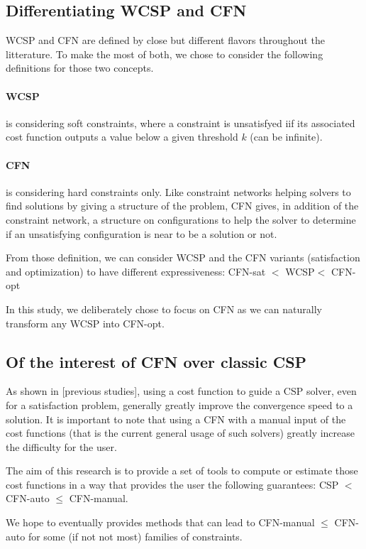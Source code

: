 \documentclass[letterpaper]{article} %
\newcommand{\cfn}{\textsc{CFN}\xspace}
\newcommand{\wcsp}{\textsc{WCSP}\xspace}
\begin{document}
\subsection{Differentiating \wcsp and \cfn}
\wcsp and \cfn are defined by close but different flavors throughout the litterature. To make the most of both, we chose to consider the following definitions for those two concepts.

\paragraph{\wcsp} is  considering soft  constraints, where  a constraint  is
  unsatisfyed iif its associated cost function outputs a value below a
  given threshold $k$ (can be infinite).

\paragraph{\cfn} is  considering  hard constraints  only.  Like  constraint
  networks helping solvers to find  solutions by giving a structure of
  the problem,  CFN gives,  in addition of  the constraint  network, a
  structure on  configurations to help  the solver to determine  if an
  unsatisfying configuration is near to be a solution or not.

From those definition, we can consider \wcsp and the \cfn variants (satisfaction and optimization) to have different expressiveness: \cfn-sat $<$ \wcsp $<$ \cfn-opt

In this study, we deliberately chose to focus on \cfn as we can naturally transform any \wcsp into \cfn-opt.

\subsection{Of the interest of \cfn over classic CSP}
As shown in [previous studies], using a cost function to guide a CSP solver, even for a satisfaction problem, generally greatly improve the convergence speed to a solution.
It is important to note that using a \cfn with a manual input of the cost functions (that is the current general usage of such solvers) greatly increase the difficulty for the user.

The aim of this research is to provide a set of tools to compute or estimate those cost functions in a way that provides the user the following guarantees:
CSP $<$ CFN-auto $\leq$ CFN-manual.

We hope to eventually provides methods that can lead to CFN-manual $\leq$ CFN-auto for some (if not not most) families of constraints.
\end{document}
